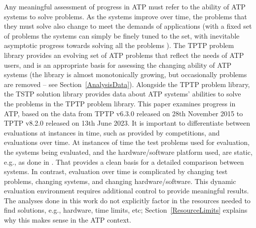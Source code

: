 \documentclass[runningheads]{llncs}
\begin{document}
Any meaningful assessment of progress in ATP must refer to the ability of ATP systems to solve 
problems.
As the systems improve over time, the problems that they must solve also change to meet 
the demands of applications (with a fixed set of problems the systems can simply be finely 
tuned to the set, with inevitable asymptotic progress towards solving all the problems 
\cite{OB+22}).
The TPTP problem library provides an evolving set of ATP problems that reflect the needs of 
ATP users, and is an appropriate basis for assessing the changing ability of ATP systems
(the library is almost monotonically growing, but occasionally problems are removed -- 
see Section~\ref{AnalysisData}).
Alongside the TPTP problem library, the TSTP solution library provides data about ATP systems' 
abilities to solve the problems in the TPTP problem library.
This paper examines progress in ATP, based on the data from TPTP v6.3.0 released on 
28th November 2015 to TPTP v8.2.0 released on 13th June 2023.
It is important to differentiate between evaluations at instances in time, such as provided by
competitions, and evaluations over time.
At instances of time the test problems used for evaluation, the systems being evaluated, and
the hardware/software platform used, are static, e.g., as done in \cite{CSW15}.
That provides a clean basis for a detailed comparison between systems.
In contrast, evaluation over time is complicated by changing test problems, changing systems,
and changing hardware/software.
This dynamic evaluation environment requires additional control to provide meaningful results.
The analyses done in this work do not explicitly factor in the resources needed to find solutions, 
e.g., hardware, time limits, etc; Section~\ref{ResourceLimits} explains why this makes sense in 
the ATP context.
\end{document}

